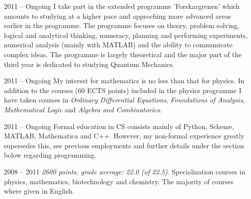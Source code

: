 
      {2011 -- Ongoing}
      {I take part in the extended programme 'Forskargrenen' which amounts to
       studying at a higher pace and approching more advanced areas earlier
       in the programme. The programme focuses on theory, problem solving, logical and analytical
       thinking, numeracy, planning and performing experiments,
       numerical analysis (mainly with MATLAB) and the ability to communicate
       complex ideas. The programme is largely theoretical and the major part of the
       third year is dedicated to studying Quantum Mechanics.}

      {2011 -- Ongoing}
      {My interest for mathematics is no less than that for physics.
       In addition to the courses (60 ECTS points) included in the physics
       programme I have taken courses in \emph{Ordinary Differential Equations},
       \emph{Foundations of Analysis}, \emph{Mathematical Logic} and
       \emph{Algebra and Combinatorics}.}

      {2011 -- Ongoing}
      {Formal education in CS consists mainly of Python, Scheme, MATLAB, Mathematica and C++.
       However, my non-formal experience greatly supersedes this, see
       previous employments and further details under the section below regarding programming.}

      {2008 -- 2011}
      {\textit{2600 points, grade average: 22.0 (of 22.5)}. Specialization courses in physics, mathematics,
       biotechnology and chemistry. The majority of courses where given in English.}
